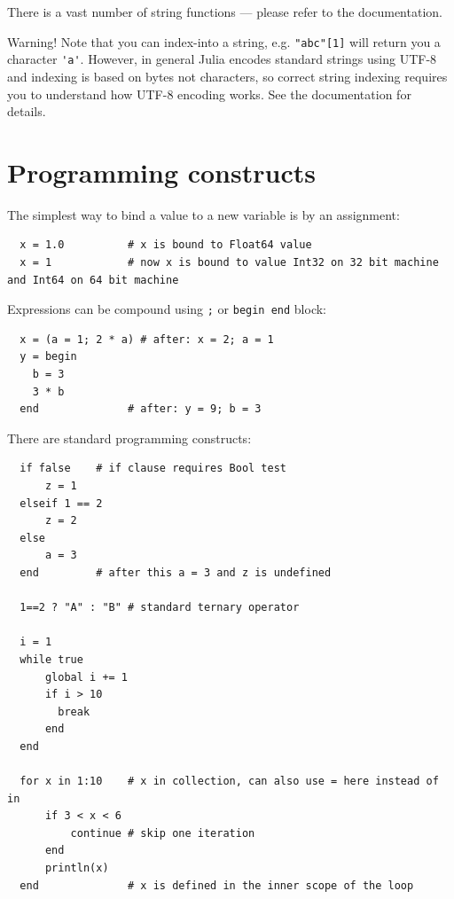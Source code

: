 \documentclass[10pt,a4paper]{article}
\begin{document}
There is a vast number of string functions --- please refer to the documentation.

Warning! Note that you can index-into a string, e.g. \lstinline|"abc"[1]| will
return you a character \lstinline|'a'|. However, in general Julia encodes
standard strings using UTF-8 and indexing is based on bytes not characters, so
correct string indexing requires you to understand how UTF-8 encoding works. See
the documentation for details.

\section{Programming constructs}
The simplest way to bind a value to a new variable is by an assignment:
\begin{lstlisting}
  x = 1.0          # x is bound to Float64 value
  x = 1            # now x is bound to value Int32 on 32 bit machine and Int64 on 64 bit machine
\end{lstlisting}

Expressions can be compound using \lstinline|;| or \lstinline|begin end| block:
\begin{lstlisting}
  x = (a = 1; 2 * a) # after: x = 2; a = 1
  y = begin
    b = 3
    3 * b
  end              # after: y = 9; b = 3
\end{lstlisting}

There are standard programming constructs:
\begin{lstlisting}
  if false    # if clause requires Bool test
      z = 1
  elseif 1 == 2
      z = 2
  else
      a = 3
  end         # after this a = 3 and z is undefined

  1==2 ? "A" : "B" # standard ternary operator

  i = 1
  while true
      global i += 1
      if i > 10
        break
      end
  end

  for x in 1:10    # x in collection, can also use = here instead of in
      if 3 < x < 6
          continue # skip one iteration
      end
      println(x)
  end              # x is defined in the inner scope of the loop
\end{lstlisting}
\end{document}
